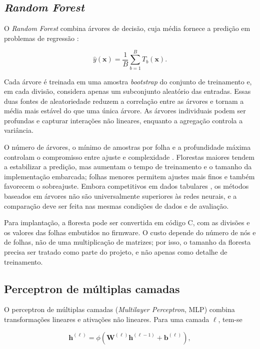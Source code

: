 \subsection{\textit{Random Forest}}
\label{subsec:ft-rf}

O \textit{Random Forest} combina árvores de decisão, cuja média fornece
a predição em problemas de regressão \cite{breiman2001}:

\begin{equation}
\label{eq:ft-rf}
\hat{y}(\mathbf{x})=\frac{1}{B}\sum_{b=1}^{B}T_b(\mathbf{x}).
\end{equation}

Cada árvore é treinada em uma amostra \textit{bootstrap} do conjunto de
treinamento e, em cada divisão, considera apenas um subconjunto
aleatório das entradas. Essas duas fontes de aleatoriedade reduzem a
correlação entre as árvores e tornam a média mais estável do que uma
única árvore. As árvores individuais podem ser profundas e capturar
interações não lineares, enquanto a agregação controla a variância.

O número de árvores, o mínimo de amostras por folha e a profundidade
máxima controlam o compromisso entre ajuste e complexidade
\cite{probst2018}. Florestas
maiores tendem a estabilizar a predição, mas aumentam o tempo de
treinamento e o tamanho da implementação embarcada; folhas menores
permitem ajustes mais finos e também favorecem o sobreajuste. Embora
competitivos em dados tabulares \cite{grinsztajn2022}, os métodos
baseados em árvores não são universalmente superiores às redes neurais,
e a comparação deve ser feita nas mesmas condições de dados e de
avaliação.

Para implantação, a floresta pode ser convertida em código C, com as
divisões e os valores das folhas embutidos no firmware. O custo depende
do número de nós e de folhas, não de uma multiplicação de matrizes; por
isso, o tamanho da floresta precisa ser tratado como parte do projeto, e
não apenas como detalhe de treinamento.

\subsection{Perceptron de múltiplas camadas}
\label{subsec:ft-mlp}

O perceptron de múltiplas camadas (\textit{Multilayer Perceptron}, MLP)
combina transformações lineares e ativações não lineares. Para uma
camada $\ell$, tem-se

\begin{equation}
\label{eq:ft-mlp}
\mathbf{h}^{(\ell)}=\phi\left(
\mathbf{W}^{(\ell)}\mathbf{h}^{(\ell-1)}+\mathbf{b}^{(\ell)}
\right),
\end{equation}

